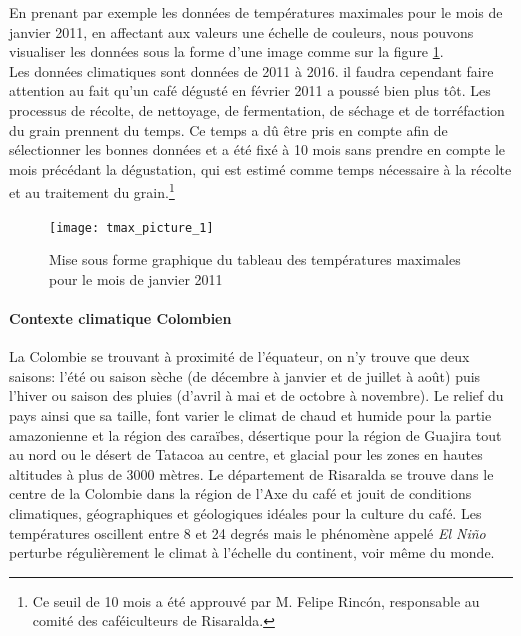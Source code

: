 \noindent En prenant par exemple les données de températures maximales pour le mois de janvier 2011, en affectant aux valeurs une échelle de couleurs, nous pouvons visualiser les données sous la forme d'une image comme sur la figure \ref{tmax_picture}.\\

\noindent Les données climatiques sont données de 2011 à 2016. il faudra cependant faire attention au fait qu'un café dégusté en février 2011 a poussé bien plus tôt. Les processus de récolte, de nettoyage, de fermentation, de séchage et de torréfaction du grain prennent du temps. Ce temps a dû être pris en compte afin de sélectionner les bonnes données et a été fixé à 10 mois sans prendre en compte le mois précédant la dégustation, qui est estimé comme temps nécessaire à la récolte et au traitement du grain.\footnote{Ce seuil de 10 mois a été approuvé par M. Felipe Rincón, responsable au comité des caféiculteurs de Risaralda.} 


\begin{figure}[H]
	\centering
	\texttt{[image: tmax\_picture\_1]}
	\caption{\label{tmax_picture} Mise sous forme graphique du tableau des températures maximales pour le mois de janvier 2011 }
\end{figure}

\paragraph{Contexte climatique Colombien}La Colombie se trouvant à proximité de l'équateur, on n'y trouve que deux saisons: l'été ou saison sèche (de décembre à janvier et de juillet à août) puis l'hiver ou saison des pluies (d'avril à mai et de octobre à novembre). Le relief du pays ainsi que sa taille, font varier le climat de chaud et humide pour la partie amazonienne et la région des caraïbes, désertique pour la région de Guajira tout au nord ou le désert de Tatacoa au centre, et glacial pour les zones en hautes altitudes à plus de 3000 mètres. Le département de Risaralda se trouve dans le centre de la Colombie dans la région de l'Axe du café et jouit de conditions climatiques, géographiques et géologiques idéales pour la culture du café.\cite{WikiCafeicultureColombie} \cite{IDEAM} \cite{WikiMeteo} Les températures oscillent entre 8 et 24 degrés mais le phénomène appelé \textit{El Niño} perturbe régulièrement le climat à l'échelle du continent, voir même du monde. 




